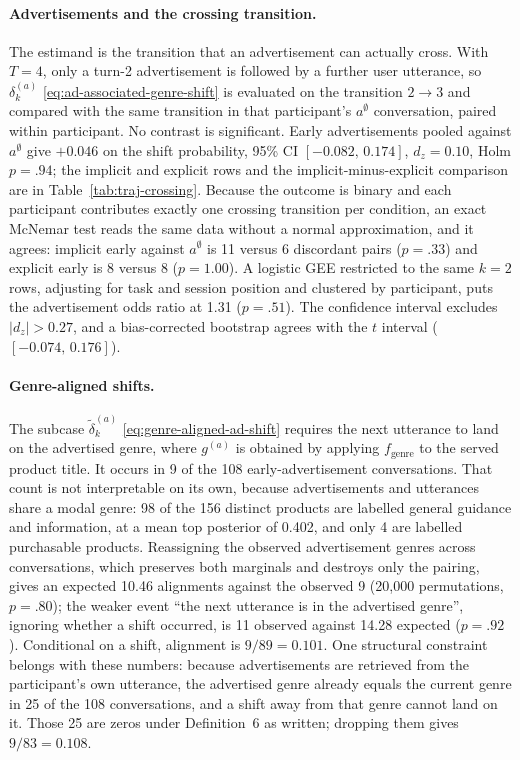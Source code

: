 \paragraph{Advertisements and the crossing transition.}
The estimand is the transition that an advertisement can actually cross. With \(T=4\), only a turn-2 advertisement is followed by a further user utterance, so \(\delta^{(a)}_k\) \eqref{eq:ad-associated-genre-shift} is evaluated on the transition \(2\rightarrow3\) and compared with the same transition in that participant's \(a^{\emptyset}\) conversation, paired within participant. No contrast is significant. Early advertisements pooled against \(a^{\emptyset}\) give \(+0.046\) on the shift probability, 95\% CI \([-0.082,\,0.174]\), \(d_z=0.10\), Holm \(p=.94\); the implicit and explicit rows and the implicit-minus-explicit comparison are in Table~\ref{tab:traj-crossing}. Because the outcome is binary and each participant contributes exactly one crossing transition per condition, an exact McNemar test reads the same data without a normal approximation, and it agrees: implicit early against \(a^{\emptyset}\) is 11 versus 6 discordant pairs (\(p=.33\)) and explicit early is 8 versus 8 (\(p=1.00\)). A logistic GEE restricted to the same \(k=2\) rows, adjusting for task and session position and clustered by participant, puts the advertisement odds ratio at 1.31 (\(p=.51\)). The confidence interval excludes \(|d_z|>0.27\), and a bias-corrected bootstrap agrees with the \(t\) interval (\([-0.074,\,0.176]\)).

\paragraph{Genre-aligned shifts.}
The subcase \(\tilde{\delta}^{(a)}_k\) \eqref{eq:genre-aligned-ad-shift} requires the next utterance to land on the advertised genre, where \(g^{(a)}\) is obtained by applying \(f_{\mathrm{genre}}\) to the served product title. It occurs in 9 of the 108 early-advertisement conversations. That count is not interpretable on its own, because advertisements and utterances share a modal genre: 98 of the 156 distinct products are labelled general guidance and information, at a mean top posterior of 0.402, and only 4 are labelled purchasable products. Reassigning the observed advertisement genres across conversations, which preserves both marginals and destroys only the pairing, gives an expected 10.46 alignments against the observed 9 (20{,}000 permutations, \(p=.80\)); the weaker event ``the next utterance is in the advertised genre'', ignoring whether a shift occurred, is 11 observed against 14.28 expected (\(p=.92\)). Conditional on a shift, alignment is \(9/89=0.101\). One structural constraint belongs with these numbers: because advertisements are retrieved from the participant's own utterance, the advertised genre already equals the current genre in 25 of the 108 conversations, and a shift away from that genre cannot land on it. Those 25 are zeros under Definition~6 as written; dropping them gives \(9/83=0.108\).

